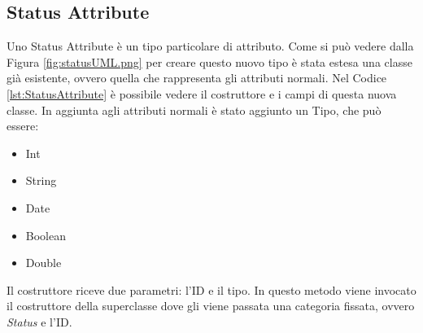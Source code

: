 \subsection{Status Attribute}
\label{sub:status_attribute}
Uno Status Attribute è un tipo particolare di attributo. Come si può vedere dalla Figura \ref{fig:statusUML.png} per creare questo nuovo tipo è stata estesa una classe già esistente, ovvero quella che rappresenta gli attributi normali.
Nel Codice \ref{lst:StatusAttribute} è possibile vedere il costruttore e i campi di questa nuova classe. In aggiunta agli attributi normali è stato aggiunto un Tipo, che può essere:
\begin{itemize}
	\item Int
	\item String
	\item Date
	\item Boolean
	\item Double
\end{itemize}
Il costruttore riceve due parametri: l'ID e il tipo. In questo metodo viene invocato il costruttore della superclasse dove gli viene passata una categoria fissata, ovvero \textit{Status} e l'ID.
